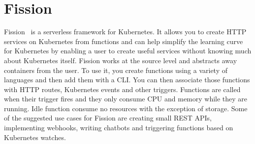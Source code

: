 \section{Fission}

Fission~\cite{hid-sp18-521-FissionBlog} is a serverless framework for
Kubernetes. It allows you to create HTTP services on Kubernetes from
functions and can help simplify the learning curve for Kubernetes by
enabling a user to create useful services without knowing much about
Kubernetes itself. Fission works at the source level and abstracts 
away containers from the user. To use it, you create functions using
a variety of languages and then add them with a CLI\@. You can then 
associate those functions with HTTP routes, Kubernetes events and 
other triggers. Functions are called when their trigger fires and 
they only consume CPU and memory while they are running. Idle function 
consume no resources with the exception of storage. Some of the 
suggested use cases for Fission are creating small REST APIs, 
implementing webhooks, writing chatbots and triggering functions 
based on Kubernetes watches.
